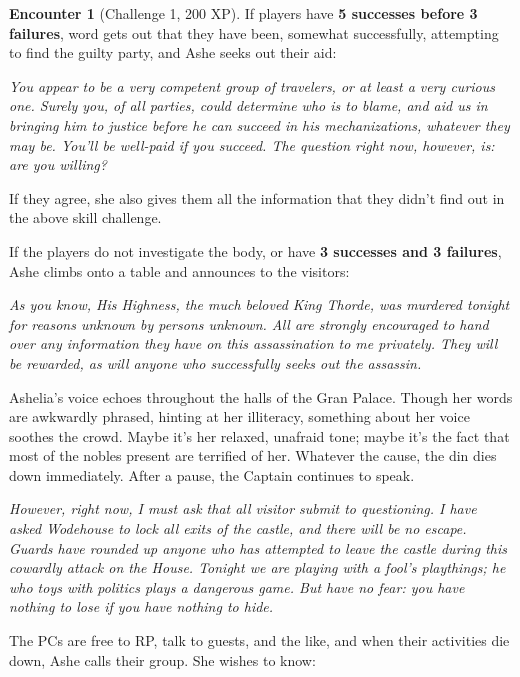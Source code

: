 \documentclass{report}
\theoremstyle{definition}
\newtheorem{enc}{Encounter}[chapter]
\begin{document}
\begin{enc}[Challenge 1, 200 XP]
If players have \textbf{5 successes before 3 failures}, word gets out that they have been, somewhat successfully, attempting to find the guilty party, and Ashe seeks out their aid:

\begin{displayquote}
\textit{You appear to be a very competent group of travelers, or at least a very curious one.  Surely you, of all parties, could determine who is to blame, and aid us in bringing him to justice before he can succeed in his mechanizations, whatever they may be.  You'll be well-paid if you succeed.  The question right now, however, is: are you willing?}
\end{displayquote}

If they agree, she also gives them all the information that they didn't find out in the above skill challenge.

If the players do not investigate the body, or have \textbf{3 successes and 3 failures}, Ashe climbs onto a table and announces to the visitors:

\begin{displayquote}
\textit{As you know, His Highness, the much beloved King Thorde, was murdered tonight for reasons unknown by persons unknown.  All are strongly encouraged to hand over any information they have on this assassination to me privately.  They will be rewarded, as will anyone who successfully seeks out the assassin.}

Ashelia's voice echoes throughout the halls of the Gran Palace. Though her words are awkwardly phrased, hinting at her illiteracy, something about her voice soothes the crowd. Maybe it's her relaxed, unafraid tone; maybe it's the fact that most of the nobles present are terrified of her. Whatever the cause, the din dies down immediately. After a pause, the Captain continues to speak.

\textit{However, right now, I must ask that all visitor submit to questioning.  I have asked Wodehouse to lock all exits of the castle, and there will be no escape. Guards have rounded up anyone who has attempted to leave the castle during this cowardly attack on the House.  Tonight we are playing with a fool's playthings; he who toys with politics plays a dangerous game.  But have no fear:  you have nothing to lose if you have nothing to hide.}
\end{displayquote}

The PCs are free to RP, talk to guests, and the like, and when their activities die down, Ashe calls their group. She wishes to know:


\end{enc}
\end{document}

